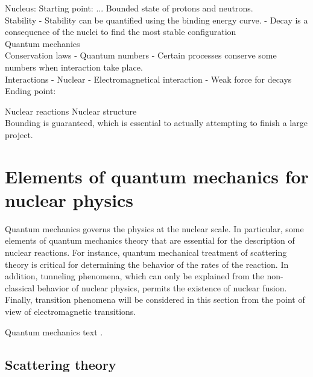 \documentclass[openany]{book}
\begin{document}
 Nucleus:
 Starting point: ...
 	Bounded state of protons and neutrons.  \\
 	
 	Stability 
 		-	Stability can be quantified using the binding energy curve. 
 		-	Decay is a consequence of the nuclei to find the most stable configuration \\
 	
 	Quantum mechanics  \\
 	
  	Conservation laws
 		-	Quantum numbers
 		-	Certain processes conserve some numbers when interaction take place.  \\
 	
 	Interactions
 		-	Nuclear 
 		-	Electromagnetical interaction
 		-	Weak force for decays \\
 		
 Ending point: 
 	
 	Nuclear reactions
 	Nuclear structure  \\
 
 
Bounding is guaranteed, which is essential to actually attempting to finish a large project. 
\section{Elements of quantum mechanics for nuclear physics} \label{sec:quantumMechanics}


Quantum mechanics governs the physics at the nuclear scale. In particular, some elements of quantum mechanics theory that are essential for the description of nuclear reactions. For instance, quantum mechanical treatment of scattering theory is critical for determining the behavior of the rates of the reaction. In addition, tunneling phenomena, which can only be explained from the non-classical behavior of nuclear physics, permits the existence of nuclear fusion. Finally, transition phenomena will be considered in this section from the point of view of electromagnetic transitions. 

Quantum mechanics text \cite{dick_2016}.

\subsection{Scattering theory} \label{sub:scatteringTheory}

\end{document}
